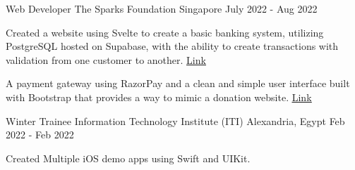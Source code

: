 \begin{cventries}
    
    \cventry
    {Web Developer} %
    {The Sparks Foundation} %
    {Singapore} %
    {July 2022 - Aug 2022} %
    {
      \begin{cvitems} %
        \item {Created a website using Svelte to create a basic banking system, utilizing PostgreSQL hosted on Supabase, with the ability to create transactions with validation from one customer to another. \textcolor{link}{\underline{\href{https://tsf-intern.vercel.app/}{Link}}}}
        \item {A payment gateway using RazorPay and a clean and simple user interface built with Bootstrap that provides a way to mimic a donation website. \textcolor{link}{\underline{\href{https://tsf-intern2.vercel.app}{Link}}}}
      \end{cvitems}
    }
    
   

    \cventry
    {Winter Trainee} %
    {Information Technology Institute (ITI)} %
    {Alexandria, Egypt} %
    {Feb 2022 - Feb 2022} %
    {
      \begin{cvitems} %
        \item {Created Multiple iOS demo apps using Swift and UIKit.}
      \end{cvitems}
    }
    
   
\end{cventries}

